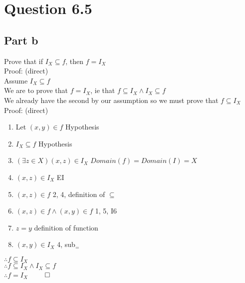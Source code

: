 \documentclass{article}
\begin{document}
	\section{Question 6.5}
		\subsection{Part b}
			Prove that if $I_{X} \subseteq f$, then $f = I_{X}$ \\
			Proof: (direct) \\
			Assume $I_{X} \subseteq f$ \\
			We are to prove that $f = I_{X}$, ie that $f \subseteq I_{X} \land I_{X} \subseteq f$ \\
			We already have the second by our assumption so we must prove that $f \subseteq I_{X}$ \\
			Proof: (direct)
			\begin{enumerate}
				\item Let $(x, y) \in f$ \hfill Hypothesis
				\item $I_{X} \subseteq f$ \hfill Hypothesis
				\item $(\exists z \in X)(x, z) \in I_{X}$ \hfill $Domain(f) = Domain(I) = X$
				\item $(x, z) \in I_{X}$ \hfill EI
				\item $(x, z) \in f$ \hfill 2, 4, definition of $\subseteq$
				\item $(x, z) \in f \land (x, y) \in f$ \hfill 1, 5, I6
				\item $z = y$ \hfill definition of function
				\item $(x, y) \in I_{X}$ \hfill 4, sub$_{=}$
			\end{enumerate}
			$\therefore f \subseteq I_{X}$ \\
			$\therefore f \subseteq I_{X} \land I_{X} \subseteq f$ \\
			$\therefore f = I_{X}$ \hfill $\qed$ \\
\end{document}
